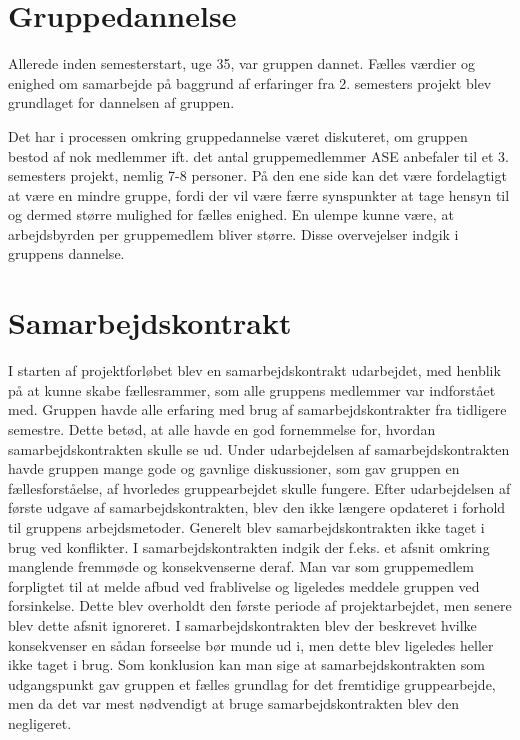 \section{Gruppedannelse}
Allerede inden semesterstart, uge 35, var gruppen dannet. Fælles værdier og enighed om samarbejde på baggrund af erfaringer fra 2. semesters projekt
blev grundlaget for dannelsen af gruppen.

Det har i processen omkring gruppedannelse været diskuteret, om gruppen bestod af nok medlemmer ift. det antal gruppemedlemmer ASE anbefaler til et 3. semesters
projekt, nemlig 7-8 personer. På den ene side kan det være fordelagtigt at være en mindre gruppe, fordi der vil være færre synspunkter at tage hensyn til
og dermed større mulighed for fælles enighed. En ulempe kunne være, at arbejdsbyrden per gruppemedlem bliver større. Disse overvejelser indgik i gruppens dannelse.\\

\section{Samarbejdskontrakt}
I starten af projektforløbet blev en samarbejdskontrakt udarbejdet, med henblik på at kunne skabe fællesrammer, som alle gruppens medlemmer var indforstået med.
Gruppen havde alle erfaring med brug af samarbejdskontrakter fra tidligere semestre. Dette betød, at alle havde en god fornemmelse for, hvordan 
samarbejdskontrakten skulle se ud. Under udarbejdelsen af samarbejdskontrakten havde gruppen mange gode og gavnlige diskussioner, som gav gruppen en 
fællesforståelse, af hvorledes gruppearbejdet skulle fungere. 
Efter udarbejdelsen af første udgave af samarbejdskontrakten, blev den ikke længere opdateret i forhold til gruppens arbejdsmetoder. Generelt blev 
samarbejdskontrakten ikke taget i brug ved konflikter. I samarbejdskontrakten indgik der f.eks. et afsnit omkring manglende fremmøde og konsekvenserne deraf. 
Man var som gruppemedlem forpligtet til at melde afbud ved frablivelse og ligeledes meddele gruppen ved forsinkelse. Dette blev overholdt den første periode 
af projektarbejdet, men senere blev dette afsnit ignoreret. I samarbejdskontrakten blev der beskrevet hvilke konsekvenser en sådan forseelse bør munde ud i, 
men dette blev ligeledes heller ikke taget i brug. 
Som konklusion kan man sige at samarbejdskontrakten som udgangspunkt gav gruppen et fælles grundlag for det fremtidige gruppearbejde, men da det var mest
 nødvendigt at bruge samarbejdskontrakten blev den negligeret.
 
